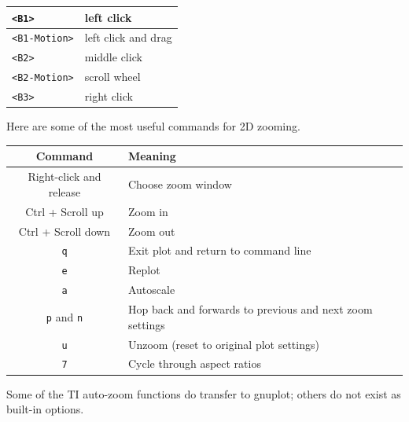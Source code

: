 \documentclass[11pt,letterpaper]{report}
\begin{document}
\begin{center}
	\begin{tabular}{|l|l|}
	\hline 
	\verb+<B1>+ & left click \\
	\hline
	\verb+<B1-Motion>+ & left click and drag \\
	\hline
	\verb+<B2>+ & middle click \\
	\hline
	\verb+<B2-Motion>+ & scroll wheel \\
	\hline
	\verb+<B3>+ & right click \\
	\hline
	\end{tabular}
\end{center}

Here are some of the most useful commands for 2D zooming.

\begin{center}
	\begin{tabular}{|c|l|}
	\hline 
	Command & Meaning \\
	\hline
	Right-click and release & Choose zoom window \\
	\hline
	Ctrl + Scroll up & Zoom in \\
	\hline
	Ctrl + Scroll down & Zoom out \\
	\hline
	\verb+q+ & Exit plot and return to command line \\
	\hline
	\verb+e+ & Replot \\
	\hline
	\verb+a+ & Autoscale \\
	\hline
	\verb+p+ and \verb+n+ & Hop back and forwards to previous and next zoom settings\\
	\hline
	\verb+u+ & Unzoom (reset to original plot settings) \\
	\hline
	\verb+7+ & Cycle through aspect ratios \\
	\hline
	\end{tabular}
\end{center}

Some of the TI auto-zoom functions do transfer to gnuplot; others do not exist as built-in options.
\end{document}
